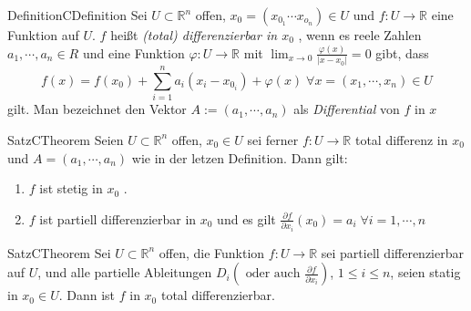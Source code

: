 
%

%
\begin{ibox}[]{Definition}{CDefinition}
    Sei $ U \subset \mathbb{R}^n  $ offen, $ x_0 = \left( x_{0_{1}} \cdots x_{o_{n}}  \right) \in U $ und 
	$ f : U \to \mathbb{R}  $ eine Funktion auf $ U $. $ f $ heißt \textit{(total) differenzierbar in $ x_0 $ }, 
	wenn es reele Zahlen $ a_1, \cdots , a_{n} \in R $ und eine Funktion $ \varphi : U \to \mathbb{R}  $ mit 
$ \lim_{x \to 0} \frac{\varphi (x)}{|x -x_0|}  = 0 $ gibt, dass
	$$ f(x) = f(x_0) + \sum_{i=1}^{n}a_{i}(x_{i}-x_{0_{i}}) + \varphi(x) \;
	\forall x=\left( x_1, \cdots , x_{n} \right) \in U  $$ 
	gilt. Man bezeichnet den Vektor $ A:=\left( a_1, \cdots, a_{n} \right) $ als \textit{Differential} von $ f \text{ in } x $ 
\end{ibox}
\begin{ibox}[30]{Satz}{CTheorem}
    Seien $ U \subset \mathbb{R}^n  $ offen, $ x_0 \in U $ sei ferner $ f: U \to \mathbb{R}  $ total differenz
	in $ x_0 $ und $ A = \left( a_1, \cdots, a_{n} \right)  $ wie in der letzen Definition. Dann gilt:
	\begin{enumerate}[label=\alph*)]
		\item $ f $ ist stetig in $ x_0 $ .
		\item $ f $ ist partiell differenzierbar in $ x_0 $ und es gilt $ \frac{\partial f}{\partial x_{i}} (x_0) = a_{i} 
			 \; \forall i = 1, \cdots, n $ 
	\end{enumerate}
\end{ibox}
\begin{ibox}[31]{Satz}{CTheorem}
    Sei $ U \subset \mathbb{R}^n  $ offen, die Funktion $ f: U \to \mathbb{R}  $ sei partiell differenzierbar auf 
	$ U $, und alle partielle Ableitungen $ D_i \left( \text{ oder auch }  \frac{\partial f}{\partial x_i} \right)  $,
	 $ 1 \leq i \leq n $, seien statig in $ x_0 \in U $. Dann ist $ f $ in 
	$ x_0 $ total differenzierbar.
\end{ibox}

